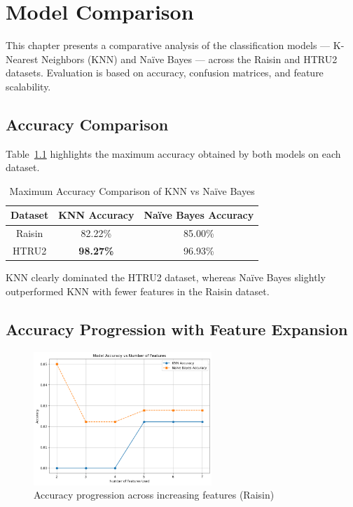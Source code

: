 \chapter{Model Comparison}
\label{ch:comparison}

This chapter presents a comparative analysis of the classification models — K-Nearest Neighbors (KNN) and Naïve Bayes — across the Raisin and HTRU2 datasets. Evaluation is based on accuracy, confusion matrices, and feature scalability.

\section{Accuracy Comparison}
\label{sec:comp_accuracy}

Table~\ref{tab:comp_accuracy} highlights the maximum accuracy obtained by both models on each dataset.

\begin{table}[H]
    \centering
    \caption{Maximum Accuracy Comparison of KNN vs Naïve Bayes}
    \label{tab:comp_accuracy}
    \begin{tabular}{|c|c|c|}
        \hline
        \textbf{Dataset} & \textbf{KNN Accuracy} & \textbf{Naïve Bayes Accuracy} \\
        \hline
        Raisin      & 82.22\% & 85.00\% \\
        HTRU2       & \textbf{98.27\%} & 96.93\% \\
        \hline
    \end{tabular}
\end{table}

KNN clearly dominated the HTRU2 dataset, whereas Naïve Bayes slightly outperformed KNN with fewer features in the Raisin dataset.

\section{Accuracy Progression with Feature Expansion}
\label{sec:comp_progression}

\begin{figure}[H]
    \centering
    \includegraphics[width=0.6\textwidth]{figures/feature_accuracy_comparison.png}
    \caption{Accuracy progression across increasing features (Raisin)}
    \label{fig:feature_progression}
\end{figure}


